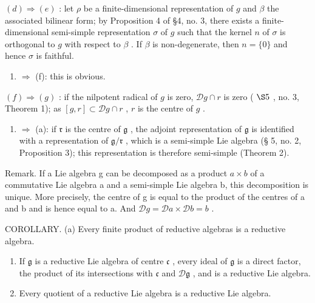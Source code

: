 \((d) \Rightarrow (e)\) : let \(\rho\) be a finite-dimensional representation of \(g\) and \(\beta\) the associated bilinear form; by Proposition 4 of §4, no. 3, there exists a finite-dimensional semi-simple representation \(\sigma\) of \(g\) such that the kernel \(n\) of \(\sigma\) is orthogonal to \(g\) with respect to \(\beta\) . If \(\beta\) is non-degenerate, then \(n = \{0\}\) and hence \(\sigma\) is faithful.

\begin{enumerate}
\def\labelenumi{(\alph{enumi})}
\setcounter{enumi}{4}
\tightlist
\item
  \(\Rightarrow\) (f): this is obvious.
\end{enumerate}

\((f) \Rightarrow (g)\) : if the nilpotent radical of \(g\) is zero, \(\mathcal{D}g \cap r\) is zero ( \(\S 5\) , no. 3, Theorem 1); as \([g, r] \subset \mathcal{D}g \cap r\) , \(r\) is the centre of \(g\) .

\begin{enumerate}
\def\labelenumi{(\alph{enumi})}
\setcounter{enumi}{6}
\tightlist
\item
  \(\Rightarrow\) (a): if \(\mathfrak{r}\) is the centre of \(\mathfrak{g}\) , the adjoint representation of \(\mathfrak{g}\) is identified with a representation of \(\mathfrak{g} / \mathfrak{r}\) , which is a semi-simple Lie algebra (§ 5, no. 2, Proposition 3); this representation is therefore semi-simple (Theorem 2).
\end{enumerate}

Remark. If a Lie algebra g can be decomposed as a product \(a \times b\) of a commutative Lie algebra a and a semi-simple Lie algebra b, this decomposition is unique. More precisely, the centre of g is equal to the product of the centres of a and b and is hence equal to a. And \(\mathcal{D}g = \mathcal{D}a \times \mathcal{D}b = b\) .

COROLLARY. (a) Every finite product of reductive algebras is a reductive algebra.

\begin{enumerate}
\def\labelenumi{(\alph{enumi})}
\setcounter{enumi}{1}
\item
  If \(\mathfrak{g}\) is a reductive Lie algebra of centre \(\mathfrak{c}\) , every ideal of \(\mathfrak{g}\) is a direct factor, the product of its intersections with \(\mathfrak{c}\) and \(\mathcal{D}\mathfrak{g}\) , and is a reductive Lie algebra.
\item
  Every quotient of a reductive Lie algebra is a reductive Lie algebra.
\end{enumerate}

